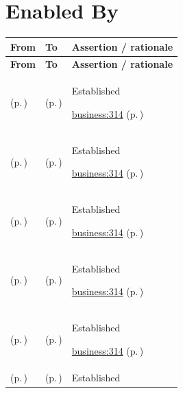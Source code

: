 \section{Enabled By}
\begingroup\small\setlength{\TableWidth}{\dimexpr\linewidth-6\tabcolsep-4\arrayrulewidth\relax}
\begin{longtable}{|>{\raggedright\arraybackslash}p{0.27\TableWidth}|>{\raggedright\arraybackslash}p{0.27\TableWidth}|>{\raggedright\arraybackslash}p{0.46\TableWidth}|}
\hline\rowcolor{TableHead}\textbf{From} & \textbf{To} & \textbf{Assertion / rationale}\\\hline\endfirsthead
\hline\rowcolor{TableHead}\textbf{From} & \textbf{To} & \textbf{Assertion / rationale}\\\hline\endhead
\hline\endfoot
\nameref{cap:bc-individual-care-delivery} (p.\,\pageref{cap:bc-individual-care-delivery}) & \nameref{cap:bec-health-information-access} (p.\,\pageref{cap:bec-health-information-access}) & Established

 \hyperref[rad:business:314]{business:314} (p.\,\pageref{rad:business:314})\\\hline
\nameref{cap:bc-individual-health-assessment} (p.\,\pageref{cap:bc-individual-health-assessment}) & \nameref{cap:bec-health-information-access} (p.\,\pageref{cap:bec-health-information-access}) & Established

 \hyperref[rad:business:314]{business:314} (p.\,\pageref{rad:business:314})\\\hline
\nameref{cap:bc-clinical-determination} (p.\,\pageref{cap:bc-clinical-determination}) & \nameref{cap:bec-health-information-access} (p.\,\pageref{cap:bec-health-information-access}) & Established

 \hyperref[rad:business:314]{business:314} (p.\,\pageref{rad:business:314})\\\hline
\nameref{cap:bc-individual-care-planning} (p.\,\pageref{cap:bc-individual-care-planning}) & \nameref{cap:bec-health-information-access} (p.\,\pageref{cap:bec-health-information-access}) & Established

 \hyperref[rad:business:314]{business:314} (p.\,\pageref{rad:business:314})\\\hline
\nameref{cap:bc-clinical-intervention} (p.\,\pageref{cap:bc-clinical-intervention}) & \nameref{cap:bec-health-information-access} (p.\,\pageref{cap:bec-health-information-access}) & Established

 \hyperref[rad:business:314]{business:314} (p.\,\pageref{rad:business:314})\\\hline
\nameref{cap:bc-individual-health-monitoring} (p.\,\pageref{cap:bc-individual-health-monitoring}) & \nameref{cap:bec-health-information-access} (p.\,\pageref{cap:bec-health-information-access}) & Established


\end{longtable}
